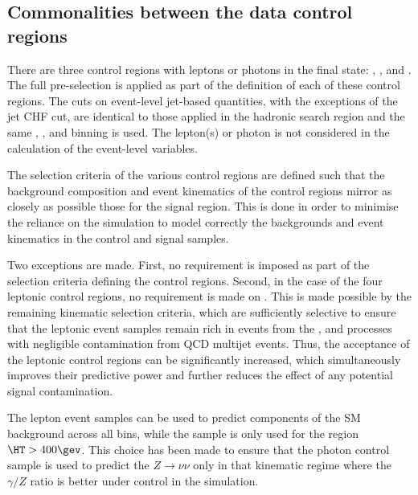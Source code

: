
\subsection{Commonalities between the data control regions}

There are three control regions with leptons or photons in the final
state: \mj, \mmj, and \gj. 
The full pre-selection is applied as part of the definition of each of these control
regions. The cuts on event-level jet-based quantities, with the exceptions of the jet CHF cut, 
are identical to those applied in the hadronic search region and the same \njet, \nb,
and \scalht binning is used. The lepton(s) or photon is not considered
in the calculation of the event-level variables.

The selection criteria of the various control regions are defined such
that the background composition and event kinematics of the control
regions mirror as closely as possible those for the signal
region. This is done in order to minimise the reliance on the
simulation to model correctly the backgrounds and event kinematics in
the control and signal samples.

Two exceptions are made. First, no \bdphi requirement is imposed as
part of the selection criteria defining the control regions. Second,
in the case of the four leptonic control regions, no requirement is
made on \alphat. This is made possible by the remaining kinematic
selection criteria, which are sufficiently selective to ensure that
the leptonic event samples remain rich in events from the \wj, \ttbar
and \zll processes with negligible contamination from QCD multijet
events. Thus, the acceptance of the leptonic control regions can be
significantly increased, which simultaneously improves their
predictive power and further reduces the effect of any potential
signal contamination.

The lepton event samples can be used to predict components of the SM
background across all \scalht bins, while the \gj sample is only 
used for the region $\HT > 400\gev$. 
This choice has been made to ensure that the photon control sample 
is used to predict the $Z\rightarrow\nu\nu$ only in that 
kinematic regime where the $\gamma/Z$ ratio is better under control in the simulation. 

